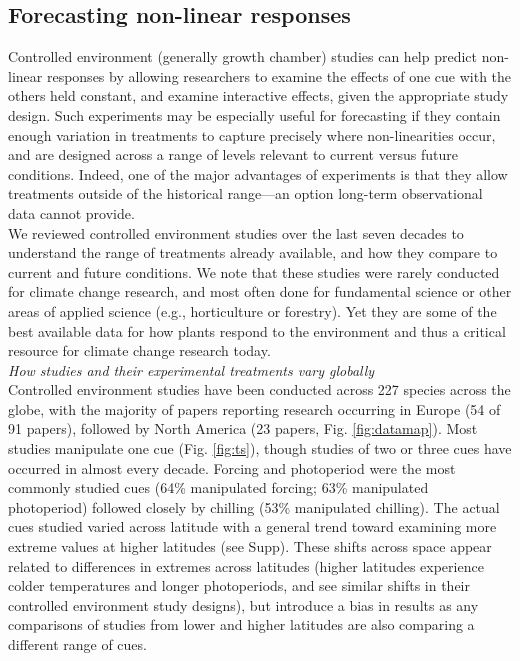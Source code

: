 \documentclass[11pt,letter]{article}
\begin{document}
\subsection{Forecasting non-linear responses} %
Controlled environment (generally growth chamber) studies can help predict non-linear responses by allowing researchers to examine the effects of one cue with the others held constant, and examine interactive effects, given the appropriate study design. Such experiments may be especially useful for forecasting if they contain enough variation in treatments to capture precisely where non-linearities occur, and are designed across a range of levels relevant to current versus future conditions. Indeed, one of the major advantages of experiments is that they allow treatments outside of the historical range---an option long-term observational data cannot provide. \\

We reviewed controlled environment studies over the last seven decades to understand the range of treatments already available, and how they compare to current and future conditions. We note that these studies were rarely conducted for climate change research, and most often done for fundamental science or other areas of applied science (e.g., horticulture or forestry). Yet they are some of the best available data for how plants respond to the environment and thus a critical resource for climate change research today.\\

\emph{How studies and their experimental treatments vary globally}\\
Controlled environment studies have been conducted across 227 species across the globe, with the majority of papers reporting research occurring in Europe (54 of 91 papers), followed by North America (23 papers, Fig. \ref{fig:datamap}). Most studies manipulate one cue (Fig. \ref{fig:ts}), though studies of two or three cues have occurred in almost every decade. Forcing and photoperiod were the most commonly studied cues (64\% manipulated forcing; 63\% manipulated photoperiod) followed closely by chilling (53\% manipulated chilling). The actual cues studied varied across latitude with a general trend toward examining more extreme values at higher latitudes (see Supp). These shifts across space appear related to differences in extremes across latitudes (higher latitudes experience colder temperatures and longer photoperiods, and see similar shifts in their controlled environment study designs), but introduce a bias in results as any comparisons of studies from lower and higher latitudes are also comparing a different range of cues. \\
\end{document}
